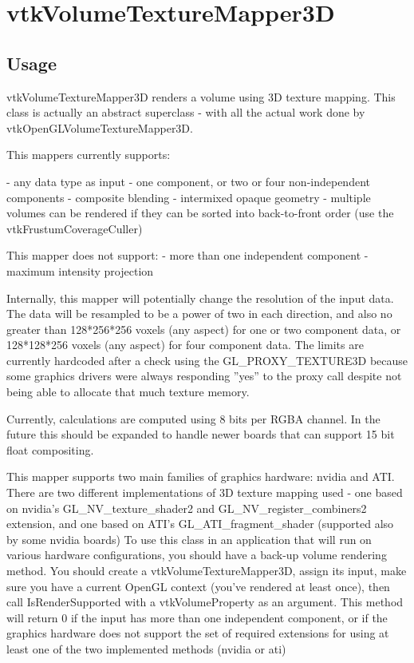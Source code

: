 \section{vtkVolumeTextureMapper3D}

\subsection{Usage}

 vtkVolumeTextureMapper3D renders a volume using 3D texture mapping. 
 This class is actually an abstract superclass - with all the actual
 work done by vtkOpenGLVolumeTextureMapper3D. 
 
 This mappers currently supports:

 - any data type as input
 - one component, or two or four non-independent components
 - composite blending
 - intermixed opaque geometry
 - multiple volumes can be rendered if they can
   be sorted into back-to-front order (use the vtkFrustumCoverageCuller)
 
 This mapper does not support:
 - more than one independent component
 - maximum intensity projection
 
 Internally, this mapper will potentially change the resolution of the
 input data. The data will be resampled to be a power of two in each
 direction, and also no greater than 128*256*256 voxels (any aspect) 
 for one or two component data, or 128*128*256 voxels (any aspect)
 for four component data. The limits are currently hardcoded after 
 a check using the GL\_PROXY\_TEXTURE3D because some graphics drivers 
 were always responding ''yes'' to the proxy call despite not being
 able to allocate that much texture memory.

 Currently, calculations are computed using 8 bits per RGBA channel.
 In the future this should be expanded to handle newer boards that
 can support 15 bit float compositing.

 This mapper supports two main families of graphics hardware:
 nvidia and ATI. There are two different implementations of
 3D texture mapping used - one based on nvidia's GL\_NV\_texture\_shader2
 and GL\_NV\_register\_combiners2 extension, and one based on
 ATI's GL\_ATI\_fragment\_shader (supported also by some nvidia boards)
 To use this class in an application that will run on various 
 hardware configurations, you should have a back-up volume rendering
 method. You should create a vtkVolumeTextureMapper3D, assign its
 input, make sure you have a current OpenGL context (you've rendered
 at least once), then call IsRenderSupported with a vtkVolumeProperty 
 as an argument. This method will return 0 if the input has more than
 one independent component, or if the graphics hardware does not
 support the set of required extensions for using at least one of
 the two implemented methods (nvidia or ati)

